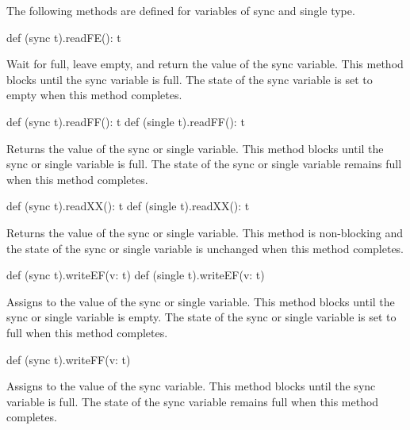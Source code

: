 The following methods are defined for variables of sync and single
type.

\begin{protohead}
def (sync t).readFE(): t
\end{protohead}
\begin{protobody}
Wait for full, leave empty, and return the value of the sync variable.
This method blocks until the sync variable is full.  The state of the
sync variable is set to empty when this method completes.
\end{protobody}

\begin{protohead}
def (sync t).readFF(): t
def (single t).readFF(): t
\end{protohead}
\begin{protobody}
Returns the value of the sync or single variable.  This method blocks
until the sync or single variable is full.  The state of the sync or
single variable remains full when this method completes.
\end{protobody}

\begin{protohead}
def (sync t).readXX(): t
def (single t).readXX(): t
\end{protohead}
\begin{protobody}
Returns the value of the sync or single variable.  This method is non-blocking
and the state of the sync or single variable is unchanged when this method
completes.
\end{protobody}

\begin{protohead}
def (sync t).writeEF(v: t)
def (single t).writeEF(v: t)
\end{protohead}
\begin{protobody}
Assigns  to the value of the sync or single variable.  This
method blocks until the sync or single variable is empty.  The state
of the sync or single variable is set to full when this method
completes.
\end{protobody}

\begin{protohead}
def (sync t).writeFF(v: t)
\end{protohead}
\begin{protobody}
Assigns  to the value of the sync variable.  This method
blocks until the sync variable is full.  The state of the sync
variable remains full when this method completes.
\end{protobody}

